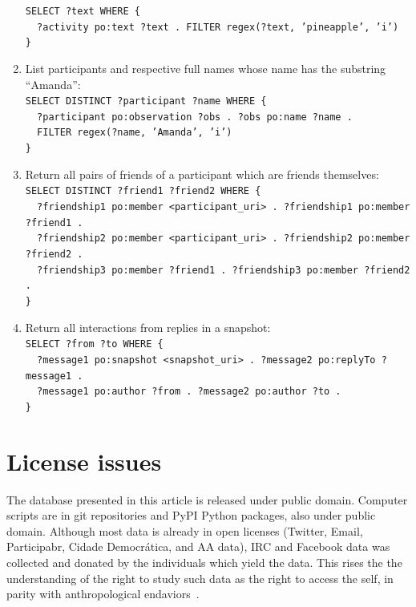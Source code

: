 \documentclass[review]{elsarticle}
\newcommand{\textttt}[1] {\texttt{\footnotesize#1}}
\newcommand{\h} {\hphantom ~ }
\begin{document}
\begin{enumerate}[leftmargin=0cm]
            \textttt{SELECT ?text WHERE \{ \\
                    \h ?activity po:text ?text . FILTER regex(?text, 'pineapple', 'i')\\
    \}}
\item List participants and respective full names whose name has the substring ``Amanda'':\\
    \textttt{SELECT DISTINCT ?participant ?name WHERE \{\\
    \h ?participant po:observation ?obs . ?obs po:name ?name .\\
    \h FILTER regex(?name, 'Amanda', 'i') \\
    \}}
\item Return all pairs of friends of a participant which are friends themselves:\\
    \textttt{SELECT DISTINCT ?friend1 ?friend2 WHERE \{\\
     \h       ?friendship1 po:member <participant\_uri> .  ?friendship1 po:member ?friend1 .\\
     \h       ?friendship2 po:member <participant\_uri> .  ?friendship2 po:member ?friend2 .\\
     \h       ?friendship3 po:member ?friend1 .  ?friendship3 po:member ?friend2 .\\
    \}}
\item Return all interactions from replies in a snapshot:\\
    \textttt{SELECT ?from ?to WHERE \{\\
          \h  ?message1 po:snapshot <snapshot\_uri> .  ?message2 po:replyTo ?message1 .\\
          \h  ?message1 po:author ?from .  ?message2 po:author ?to .\\
    \}}
\end{enumerate}

\section{License issues}
The database presented in this article is released under public domain.
Computer scripts are in git repositories and PyPI Python packages, also under public domain.
Although most data is already in open licenses (Twitter, Email, Participabr, Cidade Democrática, and AA data), IRC and Facebook data was collected
and donated by the individuals which yield the data.
This rises the the understanding of the right to study such data as the right to access the self,
in parity with anthropological endaviors~\cite{antphy,antphy2}.
\end{document}

